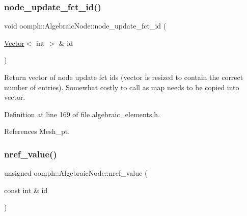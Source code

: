 \mbox{\label{classoomph_1_1AlgebraicNode_a6b910e50ee47113aa0256e46043b0f27}} 
\subsubsection{\texorpdfstring{node\+\_\+update\+\_\+fct\+\_\+id()}{node\_update\_fct\_id()}\hspace{0.1cm}{\footnotesize\ttfamily [2/2]}}
{\footnotesize\ttfamily void oomph\+::\+Algebraic\+Node\+::node\+\_\+update\+\_\+fct\+\_\+id (\begin{DoxyParamCaption}\item[{\hyperlink{classoomph_1_1Vector}{Vector}$<$ int $>$ \&}]{id }\end{DoxyParamCaption})\hspace{0.3cm}{\ttfamily [inline]}}



Return vector of node update fct ids (vector is resized to contain the correct number of entries). Somewhat costly to call as map needs to be copied into vector. 



Definition at line 169 of file algebraic\+\_\+elements.\+h.



References Mesh\+\_\+pt.

\mbox{\label{classoomph_1_1AlgebraicNode_a18b508012bc638d85539568219865383}} 
\subsubsection{\texorpdfstring{nref\+\_\+value()}{nref\_value()}\hspace{0.1cm}{\footnotesize\ttfamily [1/2]}}
{\footnotesize\ttfamily unsigned oomph\+::\+Algebraic\+Node\+::nref\+\_\+value (\begin{DoxyParamCaption}\item[{const int \&}]{id }\end{DoxyParamCaption})\hspace{0.3cm}{\ttfamily [inline]}}



